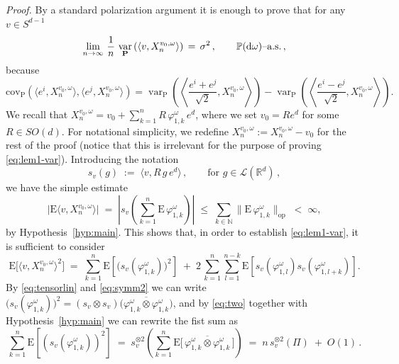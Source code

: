 \documentclass[a4paper,reqno,11pt]{amsart}
\numberwithin{equation}{section}
\newcommand{\bbP}{{\ensuremath{\mathbb P}} }
\newcommand{\cL}{{\ensuremath{\mathcal L}} }
\newcommand{\gp}{\varphi}
\newcommand{\go}{\omega}
\newcommand{\dd}{\text{\rm d}}             %
\newcommand{\R}{\mathbb{R}}
\newcommand{\N}{\mathbb{N}}
\DeclareMathOperator{\var}{var}
\def\bP{\ensuremath{\bs{\mathrm{P}}}}
\def\bE{\ensuremath{\bs{\mathrm{E}}}}
\def\bs{\boldsymbol}
\renewcommand{\phi}{\varphi}
\begin{document}
\noindent
{\it Proof.} 
By a standard polarization argument it is enough to prove that
for any $v  \in S^{d-1}$
\begin{equation}
\label{eq:lem1-var}
\lim_{n \to \infty} \, \frac 1n \,
\var_{\bP} \left( 
\langle v, X_n^{v_0, \go}\rangle
\right)
\, =\, \sigma^2 \,, \qquad \text{$\bbP(\dd \go)$--a.s.}\,,
\end{equation}
because
\begin{equation}
\mathrm{cov}_{\bP} \left( 
\langle e^i, X_n^{v_0, \go}\rangle,
\langle e^j, X_n^{v_0, \go}\rangle
\right) = \var_{\bP} \left(\left\langle \frac{e^i+ e^j}{\sqrt{2}}, X_n^{v_0, \go}\right\rangle \right) - \var_{\bP} \left(\left\langle  \frac{e^i- e^j}{\sqrt{2}}, X_n^{v_0, \go}\right\rangle \right).
\end{equation}
We recall that $X_n^{v_0, \go} = v_0 + \sum_{k=1}^n R \, \phi^\go_{1,k} \, e^d$,
where we set $v_0 = R e^d$ for some $R \in SO(d)$. For notational simplicity, we
redefine $X_n^{v_0, \go} := X_n^{v_0, \go} - v_0$ for the rest of the proof
(notice that this is irrelevant for the purpose of proving \eqref{eq:lem1-var}).
Introducing the notation
\begin{equation} \label{eq:def_sv}
	s_v(g) \;:=\; \langle v, R \, g \, e^d \rangle \,, \qquad \text{for } g \in \cL(\R^d)\,,
\end{equation}
we have the simple estimate
\begin{equation}
\label{eq:fctrlm}
\big\vert \bE \langle v,X_n^{v_0, \go}\rangle \big\vert
\; = \; \left \vert  s_v \left(\sum_{k=1}^n  \bE \, \phi_{1,k}^\go \right) \right\vert
\; \le \; \sum_{k \in \N} \big\| \bE \, \phi_{1,k}^\go \big\|_{\text{op}}
\; < \; \infty ,
\end{equation}
by Hypothesis~\ref{hyp:main}. This
shows that, in order to establish \eqref{eq:lem1-var}, it is sufficient to consider
\begin{equation}
\label{eq:diagnondiag}
\bE\big[ \langle v,X_n^{v_0, \go}\rangle ^2\big] \; =\;
\sum_{k=1}^n \bE \left[ \big (s_{v} ( \gp_{1,k}^\go )\big)^2
\right] \;+\; 2 \, \sum_{k=1}^n
\sum_{l=1}^{n-k} \bE \left[
s_{v} \left( \gp_{1,l}^\go \right)
s_{v} \left( \gp_{1,l+k}^\go \right)
\right]. 
\end{equation}
By \eqref{eq:tensorlin} and \eqref{eq:symm2} we can write $(s_{v} ( \gp_{1,k}^\go )\big)^2
= (s_v \otimes s_v)\big( \overline{\gp_{1,k}^\go \otimes \gp_{1,k}^\go} \big)$,
and by \eqref{eq:two} together with Hypothesis~\ref{hyp:main}
we can rewrite the fist sum as
\begin{equation}
	\sum_{k=1}^n \bE \left[ \left (s_{v} \left( \gp_{1,k}^\go \right)\right)^2 \right] 
	\;=\; s_v^{\otimes 2}\left(\sum_{k=1}^n  \bE \big[\,
	\overline{\gp_{1,k}^\go \otimes  \gp_{1,k}^\go}\, \big] \right) \;=\;
	n\, s_v^{\otimes 2}(\Pi)  \;+\; O(1) \,.
\end{equation}
\end{document}
